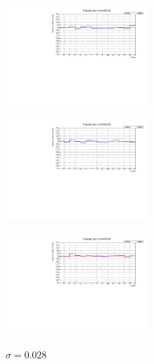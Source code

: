 \documentclass[journal]{IEEEtran}
\begin{document}
\begin{figure}[H]%
\begin{center}

\caption{$\sigma = 0.033$}
\includegraphics[width=0.48\textwidth]{analysis/output/dnl_1_400hz_bars.pdf}
\label{fig:graph_dnl_400_hz}
\caption{$\sigma = 0.031$}
\includegraphics[width=0.48\textwidth]{analysis/output/dnl_2_600hz_bars.pdf}
\label{fig:graph_dnl_600_hz}



\caption{$\sigma = 0.028$}
\includegraphics[width=0.48\textwidth]{analysis/output/dnl_3_800hz_bars.pdf}
\label{fig:graph_dnl_800_hz}

\end{center}
\end{figure}
\end{document}
